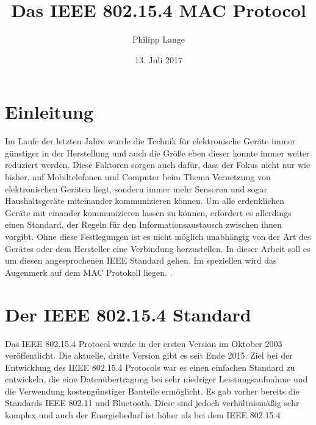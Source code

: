 \documentclass[a4paper, 12pt]{scrreprt}
\title{Das IEEE 802.15.4 MAC Protocol}
\author{Philipp Lange}
\date{13. Juli 2017}
\begin{document}
\maketitle
\tableofcontents

\newpage
\chapter{Einleitung}
Im Laufe der letzten Jahre wurde die Technik für elektronische Geräte immer günstiger in der Herstellung und auch die Größe eben dieser konnte immer weiter reduziert werden. Diese Faktoren sorgen auch dafür, dass der Fokus nicht nur wie bisher, auf Mobiltelefonen und Computer beim Thema Vernetzung von elektronischen Geräten liegt, sondern immer mehr Sensoren und sogar Haushaltsgeräte miteinander kommunizieren können.
Um alle erdenklichen Geräte mit einander kommunizieren lassen zu können, erfordert es allerdings einen Standard, der Regeln für den Informationsaustausch zwischen ihnen vorgibt. Ohne diese Festlegungen ist es nicht möglich unabhängig von der Art des Gerätes oder dem Hersteller eine Verbindung herzustellen.
In dieser Arbeit soll es um diesen angesprochenen IEEE Standard gehen. Im speziellen wird das Augenmerk auf dem MAC Protokoll liegen. \cite{Karl2007}.

\chapter{Der IEEE 802.15.4 Standard}
Das IEEE 802.15.4 Protocol wurde in der ersten Version im Oktober 2003 veröffentlicht. Die aktuelle, dritte Version gibt es seit Ende 2015. 
Ziel bei der Entwicklung des IEEE 802.15.4 Protocols war es einen einfachen Standard zu entwickeln, die eine Datenübertragung bei sehr niedriger Leistungsaufnahme und die Verwendung kostengünstiger Bauteile ermöglicht. Es gab vorher bereits die Standards IEEE 802.11 und Bluetooth. Diese sind jedoch verhältnismäßig sehr komplex und auch der Energiebedarf ist höher als bei dem IEEE 802.15.4  



\newpage

\end{document}

